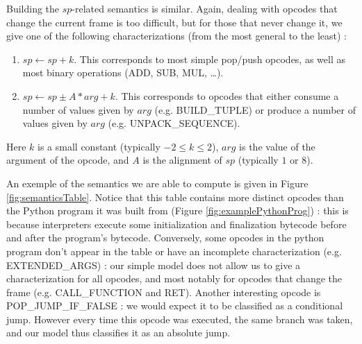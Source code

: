 \documentclass[english]{article}
\begin{document}
Building the $sp$-related semantics is similar. Again, dealing with opcodes that change the current frame is too difficult, but for those that never change it, we give one of the following characterizations (from the most general to the least) :
\begin{enumerate}
	\item $sp \leftarrow sp + k$. This corresponds to most simple pop/push opcodes, as well as most binary operations (ADD, SUB, MUL, \dots).
	\item $sp \leftarrow sp \pm A*arg + k$. This corresponds to opcodes that either consume a number of values given by $arg$ (e.g. BUILD\_TUPLE) or produce a number of values given by $arg$ (e.g. UNPACK\_SEQUENCE).
\end{enumerate}
Here $k$ is a small constant (typically $-2 \leq k \leq 2$), $arg$ is the value of the argument of the opcode, and $A$ is the alignment of $sp$ (typically $1$ or $8$).

An exemple of the semantics we are able to compute is given in Figure \ref{fig:semanticsTable}. Notice that this table contains more distinct opcodes than the Python program it was built from (Figure \ref{fig:examplePythonProg}) : this is because interpreters execute some initialization and finalization bytecode before and after the program's bytecode. Conversely, some opcodes in the python program don't appear in the table or have an incomplete characterization (e.g. EXTENDED\_ARGS) : our simple model does not allow us to give a characterization for all opcodes, and most notably for opcodes that change the frame (e.g. CALL\_FUNCTION and RET). Another interesting opcode is POP\_JUMP\_IF\_FALSE : we would expect it to be classified as a conditional jump. However every time this opcode was executed, the same branch was taken, and our model thus classifies it as an absolute jump.
\end{document}
